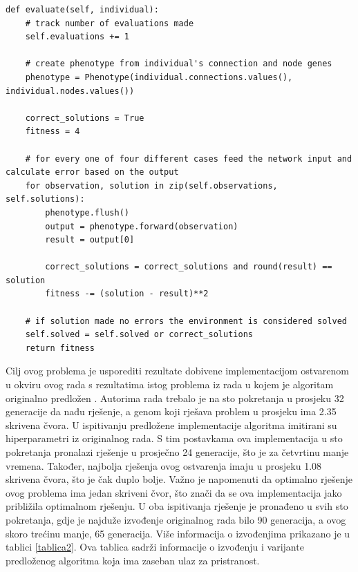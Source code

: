 \documentclass[times, utf8, diplomski, numeric]{fer}
\begin{document}
\begin{lstlisting}[frame=single, label=kod19, caption=Izvorni tekst metode \textit{evaluate} za problem konstrukcije XOR vrata]
def evaluate(self, individual):
	# track number of evaluations made
	self.evaluations += 1

	# create phenotype from individual's connection and node genes
	phenotype = Phenotype(individual.connections.values(), individual.nodes.values())

	correct_solutions = True
	fitness = 4

	# for every one of four different cases feed the network input and calculate error based on the output
	for observation, solution in zip(self.observations, self.solutions):
		phenotype.flush()
		output = phenotype.forward(observation)
		result = output[0]

		correct_solutions = correct_solutions and round(result) == solution
		fitness -= (solution - result)**2

	# if solution made no errors the environment is considered solved
	self.solved = self.solved or correct_solutions
	return fitness
\end{lstlisting}

Cilj ovog problema je usporediti rezultate dobivene implementacijom ostvarenom u okviru ovog rada s rezultatima istog problema iz rada u kojem je algoritam originalno predložen \citep{rad5}. Autorima rada trebalo je na sto pokretanja u prosjeku 32 generacije da nađu rješenje, a genom koji rješava problem u prosjeku ima 2.35 skrivena čvora. U ispitivanju predložene implementacije algoritma imitirani su hiperparametri iz originalnog rada. S tim postavkama ova implementacija u sto pokretanja pronalazi rješenje u prosječno 24 generacije, što je za četvrtinu manje vremena. Također, najbolja rješenja ovog ostvarenja imaju u prosjeku 1.08 skrivena čvora, što je čak duplo bolje. Važno je napomenuti da optimalno rješenje ovog problema ima jedan skriveni čvor, što znači da se ova implementacija jako približila optimalnom rješenju. U oba ispitivanja rješenje je pronađeno u svih sto pokretanja, gdje je najduže izvođenje originalnog rada bilo 90 generacija, a ovog skoro trećinu manje, 65 generacija. Više informacija o izvođenjima prikazano je u tablici \ref{tablica2}. Ova tablica sadrži informacije o izvođenju i varijante predloženog algoritma koja ima zaseban ulaz za pristranost.
\end{document}
